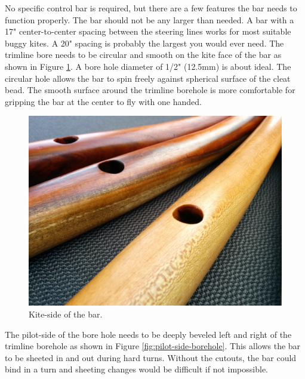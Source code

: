 \documentclass[
]{book}
\begin{document}
No specific control bar is required, but there are a few features the bar needs to function properly. The bar should not be any larger than needed. A bar with a 17" center-to-center spacing between the steering lines works for most suitable buggy kites. A 20" spacing is probably the largest you would ever need. The trimline bore needs to be circular and smooth on the kite face of the bar as shown in Figure \ref{fig:kite-side-borehole}. A bore hole diameter of 1/2" (12.5mm) is about ideal. The circular hole allows the bar to spin freely against spherical surface of the cleat bead. The smooth surface around the trimline borehole is more comfortable for gripping the bar at the center to fly with one handed.

\begin{figure}

{\centering \includegraphics[width=0.7\linewidth]{images/kite-side-borehole} 

}

\caption{Kite-side of the bar.}\label{fig:kite-side-borehole}
\end{figure}

The pilot-side of the bore hole needs to be deeply beveled left and right of the trimline borehole as shown in Figure \ref{fig:pilot-side-borehole}. This allows the bar to be sheeted in and out during hard turns. Without the cutouts, the bar could bind in a turn and sheeting changes would be difficult if not impossible.
\end{document}
